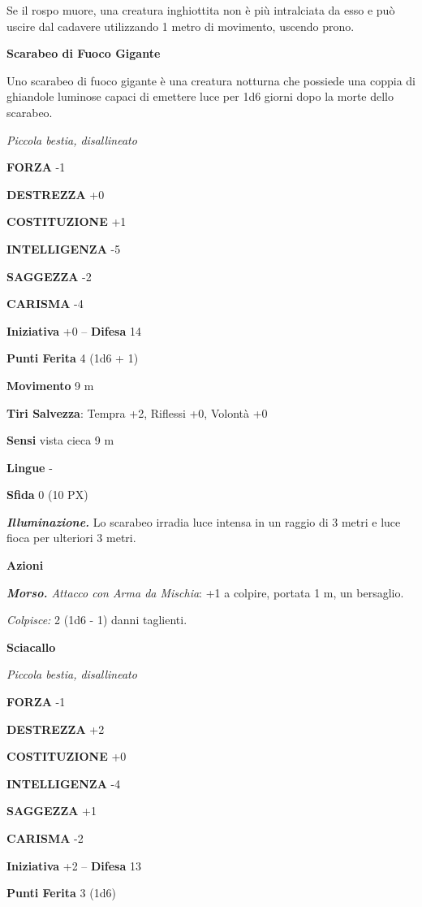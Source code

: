 \begin{multicols}{2}
Se il rospo muore, una creatura inghiottita non è più intralciata da esso e può uscire dal cadavere utilizzando 1 metro di movimento, uscendo prono.

\medskip\textbf{Scarabeo di Fuoco Gigante}

Uno scarabeo di fuoco gigante è una creatura notturna che possiede una coppia di ghiandole luminose capaci di emettere luce per 1d6 giorni dopo la morte dello scarabeo.

\textit{Piccola bestia, disallineato}

\textbf{FORZA} -1

\textbf{DESTREZZA} +0

\textbf{COSTITUZIONE} +1

\textbf{INTELLIGENZA} -5

\textbf{SAGGEZZA} -2

\textbf{CARISMA} -4

\textbf{Iniziativa} +0 -- \textbf{Difesa} 14

\textbf{Punti Ferita} 4 (1d6 + 1)

\textbf{Movimento} 9 m

\textbf{Tiri Salvezza}: Tempra +2, Riflessi +0, Volontà +0

\textbf{Sensi} vista cieca 9 m

\textbf{Lingue} -

\textbf{Sfida} 0 (10 PX)

\textit{\textbf{Illuminazione.}} Lo scarabeo irradia luce intensa in un raggio di 3 metri e luce fioca per ulteriori 3 metri.

\textbf{Azioni}

\textit{\textbf{Morso.} Attacco con Arma da Mischia}: +1 a colpire, portata 1 m, un bersaglio.

\textit{Colpisce:} 2 (1d6 - 1) danni taglienti.

\medskip\textbf{Sciacallo}

\textit{Piccola bestia, disallineato}

\textbf{FORZA} -1

\textbf{DESTREZZA} +2

\textbf{COSTITUZIONE} +0

\textbf{INTELLIGENZA} -4

\textbf{SAGGEZZA} +1

\textbf{CARISMA} -2

\textbf{Iniziativa} +2 -- \textbf{Difesa} 13

\textbf{Punti Ferita} 3 (1d6)


\end{multicols}
